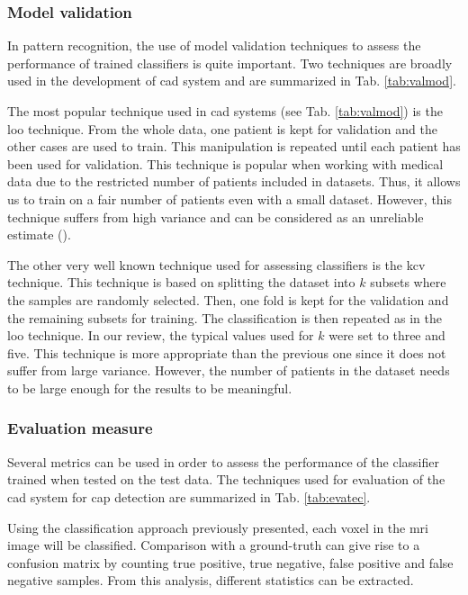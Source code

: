 \begin{enumerate}[leftmargin=*]
\end{enumerate}

\subsubsection{Model validation}

In pattern recognition, the use of model validation techniques to assess the performance of trained classifiers is quite important. Two techniques are broadly used in the development of \ac{cad} system and are summarized in Tab. \ref{tab:valmod}.

The most popular technique used in \ac{cad} systems (see Tab. \ref{tab:valmod}) is the \acf{loo} technique. From the whole data, one patient is kept for validation and the other cases are used to train. This manipulation is repeated until each patient has been used for validation. This technique is popular when working with medical data due to the restricted number of patients included in datasets. Thus, it allows us to train on a fair number of patients even with a small dataset. However, this technique suffers from high variance and can be considered as an unreliable estimate (\cite{Efron1983}).

The other very well known technique used for assessing classifiers is the \acf{kcv} technique. This technique is based on splitting the dataset into $k$ subsets where the samples are randomly selected. Then, one fold is kept for the validation and the remaining subsets for training. The classification is then repeated as in the \ac{loo} technique. In our review, the typical values used for $k$ were set to three and five. This technique is more appropriate than the previous one since it does not suffer from large variance. However, the number of patients in the dataset needs to be large enough for the results to be meaningful.

\subsubsection{Evaluation measure}\label{subsubsec:eval}

Several metrics can be used in order to assess the performance of the classifier trained when tested on the test data. The techniques used for evaluation of the \ac{cad} system for \ac{cap} detection are summarized in Tab. \ref{tab:evatec}.

Using the classification approach previously presented, each voxel in the \ac{mri} image will be classified. Comparison with a ground-truth can give rise to a confusion matrix by counting true positive, true negative, false positive and false negative samples. From this analysis, different statistics can be extracted. 

